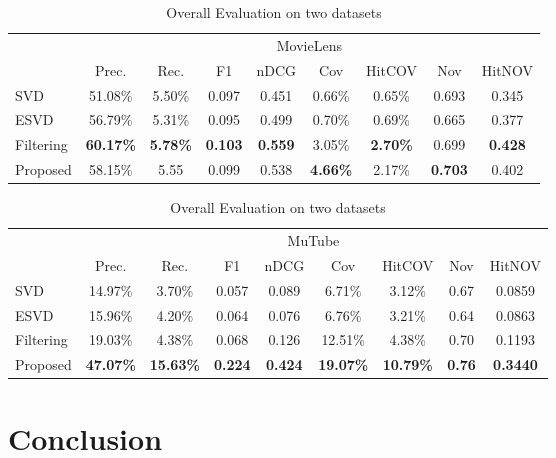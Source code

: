 \documentclass[a4paper,12pt]{report}
\begin{document}
\begin{table}[!htb]
    \centering
    \caption{Overall Evaluation on two datasets}
    \begin{tabular}{|l||c c c c| c c| c c |}
    \hline
        & \multicolumn{8}{c|}{MovieLens} \\
    \cline{2-9}
        & Prec. & Rec. & F1 & nDCG & Cov & HitCOV & Nov & HitNOV  \\
    \hline
        SVD &  51.08\% & 5.50\% & 0.097 & 0.451 & 0.66\% & 0.65\% & 0.693 & 0.345 \\
        ESVD & 56.79\% & 5.31\% & 0.095 & 0.499 & 0.70\% & 0.69\% & 0.665 & 0.377 \\
        Filtering & \textbf{60.17\%} & \textbf{5.78\%} & \textbf{0.103} & \textbf{0.559} & 3.05\% & \textbf{2.70\%} & 0.699 & \textbf{0.428} \\
        Proposed &  58.15\% & 5.55 & 0.099 & 0.538 & \textbf{4.66\%} & 2.17\% & \textbf{0.703} & 0.402 \\
    \hline
    \end{tabular}
    \bigskip
    
    \begin{tabular}{|l||c c c c| c c| c c |}
    \hline
        & \multicolumn{8}{c|}{MuTube} \\
    \cline{2-9}
        & Prec. & Rec. & F1 & nDCG & Cov & HitCOV & Nov & HitNOV  \\
    \hline
        SVD &  14.97\% & 3.70\% & 0.057 & 0.089 & 6.71\% & 3.12\% & 0.67 & 0.0859 \\
        ESVD & 15.96\% & 4.20\% & 0.064 & 0.076 & 6.76\% & 3.21\% & 0.64 & 0.0863 \\
        Filtering & 19.03\% & 4.38\% & 0.068 & 0.126 & 12.51\% & 4.38\% & 0.70 & 0.1193 \\
        Proposed &  \textbf{47.07\%} & \textbf{15.63\%} & \textbf{0.224} & \textbf{0.424} & \textbf{19.07\%} & \textbf{10.79\%} & \textbf{0.76} & \textbf{0.3440} \\
    \hline
    \end{tabular}
    \label{tab:overall_eva}
\end{table}

\chapter{Conclusion}
\end{document}
